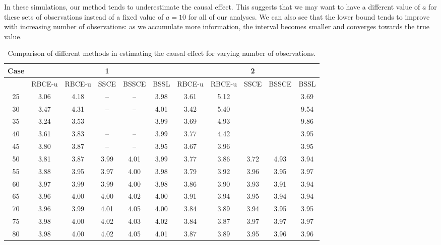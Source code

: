 \documentclass[preprint,12pt]{elsarticle}
\begin{document}
In these simulations, our method tends
to underestimate the causal effect.
This suggests that
we may want to have a different value of $a$ for these sets of observations
instead of a fixed value of $a=10$ for all of our analyses.
We can also see that the lower bound tends to improve
with increasing number of observations: as we accumulate
more information, the interval becomes smaller and converges towards
the true value.

\begin{table}[ht]
\centering
\small
\caption{Comparison of different methods in estimating the causal effect for varying number of observations.}
\begin{tabular}{c|ccccc|ccccc}
  \hline
 Case&  &  & 1 &  &  &  &  & 2 &  &  \\ 
  \hline
 & RBCE-u & RBCE-u & SSCE & BSSCE & BSSL & RBCE-u & RBCE-u & SSCE & BSSCE & BSSL \\ 
  \hline
25 & 3.06 & 4.18 & -- & -- & 3.98 & 3.61 & 5.12 &  &  & 3.69 \\ 
  30 & 3.47 & 4.31 & -- & -- & 4.01 & 3.42 & 5.40 &  &  & 9.54 \\ 
  35 & 3.24 & 3.53 & -- & -- & 3.99 & 3.69 & 4.93 &  &  & 9.86 \\ 
  40 & 3.61 & 3.83 & -- & -- & 3.99 & 3.77 & 4.42 &  &  & 3.95 \\ 
  45 & 3.80 & 3.87 & -- & -- & 3.95 & 3.67 & 3.96 &  &  & 3.95 \\ 
  50 & 3.81 & 3.87 & 3.99 & 4.01 & 3.99 & 3.77 & 3.86 & 3.72 & 4.93 & 3.94 \\ 
  55 & 3.88 & 3.95 & 3.97 & 4.00 & 3.98 & 3.79 & 3.92 & 3.96 & 3.95 & 3.97 \\ 
  60 & 3.97 & 3.99 & 3.99 & 4.00 & 3.98 & 3.86 & 3.90 & 3.93 & 3.91 & 3.94 \\ 
  65 & 3.96 & 4.00 & 4.00 & 4.02 & 4.00 & 3.91 & 3.94 & 3.95 & 3.94 & 3.94 \\ 
  70 & 3.96 & 3.99 & 4.01 & 4.05 & 4.00 & 3.84 & 3.89 & 3.94 & 3.95 & 3.95 \\ 
  75 & 3.98 & 4.00 & 4.02 & 4.03 & 4.02 & 3.84 & 3.87 & 3.97 & 3.97 & 3.97 \\ 
  80 & 3.98 & 4.00 & 4.02 & 4.05 & 4.01 & 3.87 & 3.89 & 3.95 & 3.96 & 3.96 \\ 

\end{tabular}
\end{table}
\end{document}
